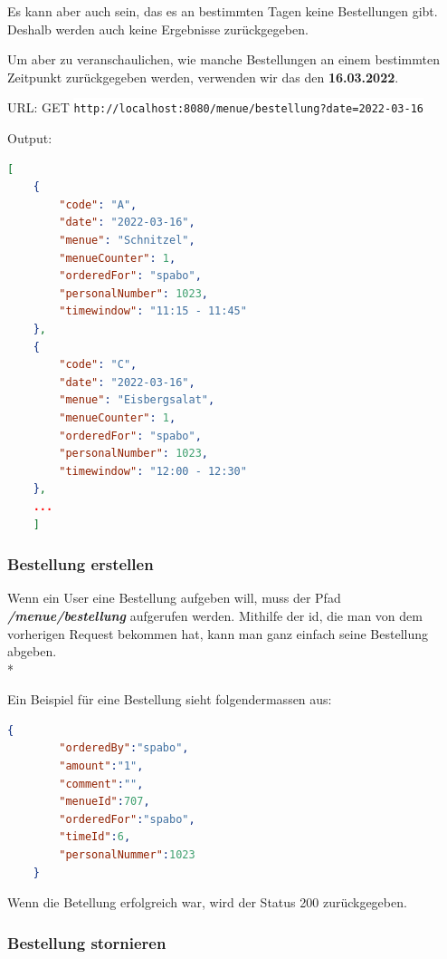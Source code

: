 Es kann aber auch sein, das es an bestimmten Tagen keine Bestellungen gibt. Deshalb werden auch keine Ergebnisse zurückgegeben.

Um aber zu veranschaulichen, wie manche Bestellungen an einem bestimmten Zeitpunkt zurückgegeben werden, verwenden wir das den \textbf{16.03.2022}.

\pagebreak

URL: GET \colorbox{white}{\lstinline[basicstyle=\ttfamily\color{black},language=html]|http://localhost:8080/menue/bestellung?date=2022-03-16|}

Output:

\begin{lstlisting}[language=json,firstnumber=1]
[
    {
        "code": "A",
        "date": "2022-03-16",
        "menue": "Schnitzel",
        "menueCounter": 1,
        "orderedFor": "spabo",
        "personalNumber": 1023,
        "timewindow": "11:15 - 11:45"
    },
    {
        "code": "C",
        "date": "2022-03-16",
        "menue": "Eisbergsalat",
        "menueCounter": 1,
        "orderedFor": "spabo",
        "personalNumber": 1023,
        "timewindow": "12:00 - 12:30"
    },
    ...
    ]
\end{lstlisting}


\subsubsection{Bestellung erstellen}

Wenn ein User eine Bestellung aufgeben will, muss der Pfad \textbf{\textit{/menue/bestellung}} aufgerufen werden. 
Mithilfe der id, die man von dem vorherigen Request bekommen hat, kann man ganz einfach seine Bestellung abgeben. \\*

Ein Beispiel für eine Bestellung sieht folgendermassen aus:

\begin{lstlisting}[language=json,firstnumber=1]
    {
        "orderedBy":"spabo",
        "amount":"1",
        "comment":"",
        "menueId":707,
        "orderedFor":"spabo",
        "timeId":6,
        "personalNummer":1023
    }
\end{lstlisting}

Wenn die Betellung erfolgreich war, wird der Status 200 zurückgegeben.


\subsubsection{Bestellung stornieren}

